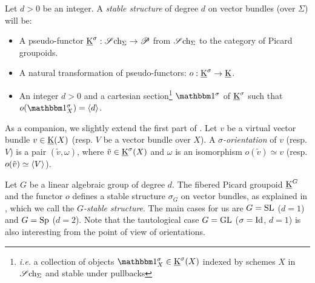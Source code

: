 \begin{df}\label{df:stable_structure}
Let $d>0$ be an integer.
A \emph{stable structure} of degree $d$ on vector bundles (over $\Sigma$) will be:
\begin{itemize}
\item A pseudo-functor $\operatorname{\underline K}^\sigma:\operatorname{\mathscr Sch_\Sigma} \rightarrow \mathscr P$ 
from  $\operatorname{\mathscr Sch_\Sigma}$ to the category of Picard groupoids.
\item A natural transformation of pseudo-functors:
$o:\operatorname{\underline K}^\sigma \rightarrow \operatorname{\underline K}$.
\item An integer $d>0$ and a cartesian section\footnote{\emph{i.e.} a collection of objects $\un^\sigma_X
\in \uK^\sigma(X)$ indexed by schemes $X$ in $\operatorname{\mathscr Sch_\Sigma}$ and stable under pullbacks} $\un^\sigma$ of $\operatorname{\underline K}^\sigma$
such that $o(\un_X^\sigma)=\tw d$.
\end{itemize}
As a companion, we slightly extend the first part of . 
 Let $v$ be a virtual vector bundle $v \in \operatorname{\underline K}(X)$ (resp. $V$ be a vector bundle over $X$).
 A \emph{$\sigma$-orientation} of $v$ (resp. $V$) is a pair $(\tilde v,\omega)$, where $\tilde v \in \operatorname{\underline K}^\sigma(X)$
 and $\omega$ is an isomorphism $o(\tilde v) \simeq v$ (resp. $o(\tilde v) \simeq \langle V \rangle$).
\end{df}

\begin{ex}\label{ex:stable_G-structure}
Let $G$ be a linear algebraic group of degree $d$.
The fibered Picard groupoid $\operatorname{\underline K}^G$ and the functor $o$ defines a stable structure $\sigma_G$
on vector bundles, as explained in ,
which we call the \emph{$G$-stable structure}.
The main cases for us are $G=\mathrm{SL}$ ($d=1$) and $G=\mathrm{Sp}$ ($d=2$).
Note that the tautological case $G=\mathrm{GL}$ ($\sigma=\operatorname{Id}$, $d=1$) is also interesting
from the point of view of orientations.
\end{ex}

